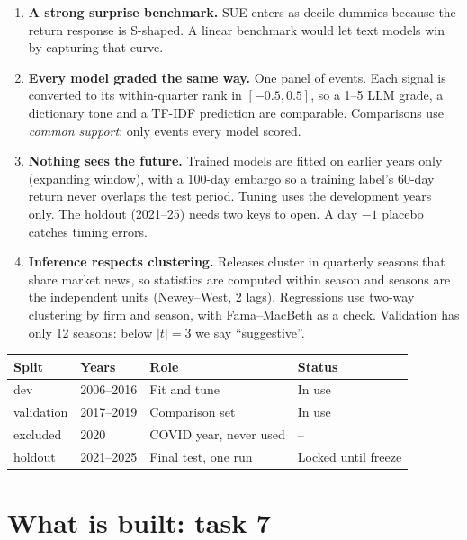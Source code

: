 \documentclass[11pt]{article}
\begin{document}
\begin{enumerate}
  \item \textbf{A strong surprise benchmark.} SUE enters as decile dummies because the return
  response is S-shaped. A linear benchmark would let text models win by capturing that curve.
  \item \textbf{Every model graded the same way.} One panel of events. Each signal is converted to its
  within-quarter rank in $[-0.5, 0.5]$, so a 1--5 LLM grade, a dictionary tone and a TF-IDF
  prediction are comparable. Comparisons use \emph{common support}: only events every model scored.
  \item \textbf{Nothing sees the future.} Trained models are fitted on earlier years only
  (expanding window), with a 100-day embargo so a training label's 60-day return never overlaps the
  test period. Tuning uses the development years only. The holdout (2021--25) needs two keys to
  open. A day $-1$ placebo catches timing errors.
  \item \textbf{Inference respects clustering.} Releases cluster in quarterly seasons that share
  market news, so statistics are computed within season and seasons are the independent units
  (Newey--West, 2 lags). Regressions use two-way clustering by firm and season, with Fama--MacBeth
  as a check. Validation has only 12 seasons: below $|t|=3$ we say ``suggestive''.
\end{enumerate}

\begin{center}
\begin{tabular}{@{}llll@{}}
\toprule
Split & Years & Role & Status \\
\midrule
dev & 2006--2016 & Fit and tune & In use \\
validation & 2017--2019 & Comparison set & In use \\
excluded & 2020 & COVID year, never used & -- \\
holdout & 2021--2025 & Final test, one run & Locked until freeze \\
\bottomrule
\end{tabular}
\end{center}

\section{What is built: task 7}
\end{document}
